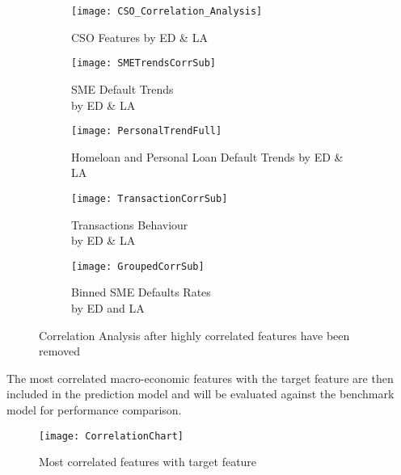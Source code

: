 \begin{figure}[H]
	\begin{adjustwidth}{-2cm}{-2cm}
	\centering
	\begin{subfigure}[b]{0.6\textwidth}
		\captionsetup{font=scriptsize}
		\texttt{[image: CSO\_Correlation\_Analysis]}
		\caption{CSO Features by ED \& LA\\}
		\label{fig:CSOCorrelation}
	\end{subfigure}
	\begin{subfigure}[b]{0.6\textwidth}
		\captionsetup{font=scriptsize}
		\texttt{[image: SMETrendsCorrSub]}
		\caption{SME Default Trends \\by ED \& LA}\label{fig:SMETrendsCorrSub}
	\end{subfigure} 
			\medskip
	\begin{subfigure}[b]{0.6\textwidth}
		\captionsetup{font=scriptsize}
		\texttt{[image: PersonalTrendFull]}
		\caption{Homeloan and Personal Loan Default Trends by ED \& LA}
		\label{fig:PersonalTrendFull}
	\end{subfigure} 
	\begin{subfigure}[b]{0.6\textwidth}
		\captionsetup{font=scriptsize}
		\texttt{[image: TransactionCorrSub]}
		\caption{Transactions Behaviour \\by ED \& LA }\label{fig:TransactionCorrSub}
	\end{subfigure}
		\medskip
	\begin{subfigure}[b]{0.6\textwidth}
		\captionsetup{font=scriptsize}
		\texttt{[image: GroupedCorrSub]}
		\caption{Binned SME Defaults Rates \\by ED and LA\\}
		\label{fig:GroupedCorrSub}
	\end{subfigure}
	\caption{Correlation Analysis after highly correlated features have been removed}
	\label{fig:unbal_corr_analysis_filtered}
	\end{adjustwidth}
\end{figure}

The most correlated macro-economic features with the target feature are then included in the prediction model and will be evaluated against the benchmark model for performance comparison. 
\begin{figure}[H]
	\texttt{[image: CorrelationChart]}
	\caption{Most correlated features with target feature}
	\label{fig:Correlation Analysis}
\end{figure}


